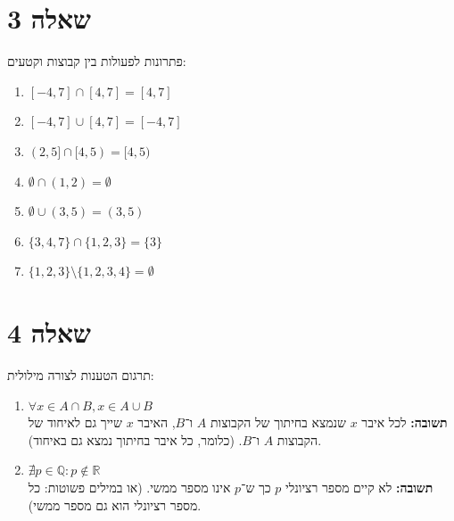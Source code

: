 \section{שאלה 3}
פתרונות לפעולות בין קבוצות וקטעים:
\begin{enumerate}
    \item $[-4, 7] \cap [4, 7] = [4, 7]$
    \item $[-4, 7] \cup [4, 7] = [-4, 7]$
    \item $(2, 5] \cap [4, 5) = [4, 5)$
    \item $\emptyset \cap (1, 2) = \emptyset$
    \item $\emptyset \cup (3, 5) = (3, 5)$
    \item $\{3, 4, 7\} \cap \{1, 2, 3\} = \{3\}$
    \item $\{1, 2, 3\} \setminus \{1, 2, 3, 4\} = \emptyset$
\end{enumerate}

\section{שאלה 4}
תרגום הטענות לצורה מילולית:
\begin{enumerate}
    \item $\forall x \in A \cap B, x \in A \cup B$ \\
    \textbf{תשובה:} לכל איבר $x$ שנמצא בחיתוך של הקבוצות $A$ ו־$B$, האיבר $x$ שייך גם לאיחוד של הקבוצות $A$ ו־$B$. (כלומר, כל איבר בחיתוך נמצא גם באיחוד).
    \item $\nexists p \in \mathbb{Q} : p \notin \mathbb{R}$ \\
    \textbf{תשובה:} לא קיים מספר רציונלי $p$ כך ש־$p$ אינו מספר ממשי. (או במילים פשוטות: כל מספר רציונלי הוא גם מספר ממשי).
\end{enumerate}

